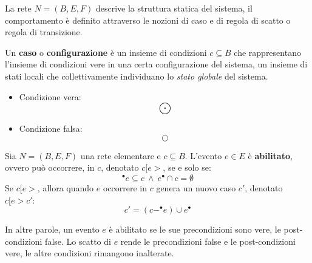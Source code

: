 La rete $N = (B, E, F)$ descrive la struttura statica del sistema, il comportamento è definito attraverso le nozioni di caso e di regola di scatto o regola di transizione.

Un \textbf{caso} o \textbf{configurazione} è un insieme di condizioni $c \subseteq B$ che rappresentano l'insieme di condizioni vere in una certa configurazione del sistema, un insieme di stati locali che collettivamente individuano lo \textit{stato globale} del sistema.
\begin{itemize}
    \item Condizione vera: $$\bigodot$$
    \item Condizione falsa: $$\bigcirc$$
\end{itemize}
\begin{definizione} 
    Sia $N = (B, E, F)$ una rete elementare e $c \subseteq B$. L'evento $e \in E$ è \textbf{abilitato}, ovvero può occorrere, in $c$, denotato $c[e >$, se e solo se:
    \begin{equation}
        ^{\bullet} e \subseteq c \ \land \ e^{\bullet} \cap c = \emptyset
    \end{equation}
    Se $c[e >$, allora quando $e$ occorrere in $c$ genera un nuovo caso $c'$, denotato $c[e > c'$:
    \begin{equation}
        c' = (c - ^{\bullet} e) \cup e^{\bullet}
    \end{equation}
\end{definizione}
In altre parole, un evento $e$ è abilitato se le sue precondizioni sono vere, le post-condizioni false. Lo scatto di $e$ rende le precondizioni false e le post-condizioni vere, le altre condizioni rimangono inalterate.

